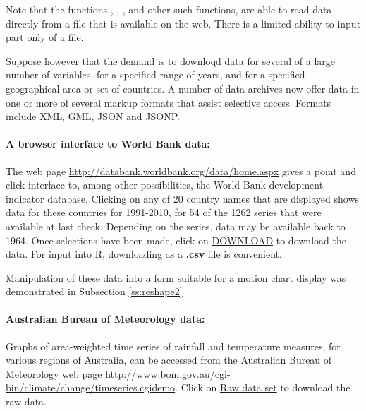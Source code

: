 Note that the functions , ,
, and other such functions, are able to read data
directly from a file that is available on the web.  There is a
limited ability to input part only of a file.

Suppose however that the demand is to downloqd data for several of a
large number of variables, for a specified range of years, and for a
specified geographical area or set of countries.    A number of data
archives now offer data in one or more of several markup formats that
assist selective access. Formats include XML, GML, JSON and JSONP.

\paragraph{A browser interface to World Bank data:}
The web page
\url{http://databank.worldbank.org/data/home.aspx} gives a point and click
interface to, among other possibilities, the World Bank development
indicator database.  Clicking on any of 20 country names that are
displayed shows data for these countries for 1991-2010, for 54 of the
1262 series that were available at last check.  Depending on the
series, data may be available back to 1964.  Once selections have been
made, click on \underline{DOWNLOAD} to download the data.  For input
into R, downloading as a {\bf .csv} file is convenient.

Manipulation of these data into a form suitable for a motion
chart display was demonstrated in Subsection \ref{ss:reshape2}

\paragraph{Australian Bureau of Meteorology data:}
Graphs of area-weighted time series of rainfall and temperature
measures, for various regions of Australia, can be accessed from the
Australian Bureau of Meteorology web page
\url{http://www.bom.gov.au/cgi-bin/climate/change/timeseries.cgidemo}.
Click on \underline{Raw data set} to download the raw data.


